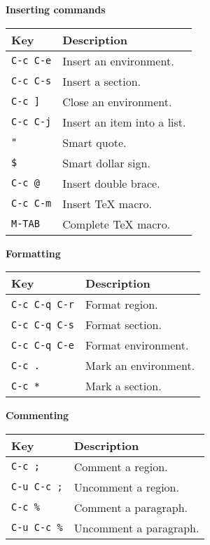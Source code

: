 \documentclass{article}
\begin{document}
\smallskip

\noindent
\textbf{Inserting commands}

\smallskip

\noindent
\begin{tabular}{p{\firstcol}p{\secondcol}}
\hline
\textbf{Key} & \textbf{Description}\\
\hline
\texttt{C-c C-e}
& Insert an environment.\\
\texttt{C-c C-s}
& Insert a section.\\
\texttt{C-c ]}
& Close an environment.\\
\texttt{C-c C-j}
& Insert an item into a list.\\
\texttt{"}
& Smart quote.\\
\texttt{\$}
& Smart dollar sign.\\
\texttt{C-c @}
& Insert double brace.\\
\texttt{C-c C-m}
& Insert \TeX{} macro.\\
\texttt{M-TAB}
& Complete \TeX{} macro.\\
\end{tabular}

\smallskip

\noindent
\textbf{Formatting}

\smallskip

\noindent
\begin{tabular}{p{\firstcol}p{\secondcol}}
\hline
\textbf{Key} & \textbf{Description}\\
\hline
\texttt{C-c C-q C-r}
& Format region.\\
\texttt{C-c C-q C-s}
& Format section.\\
\texttt{C-c C-q C-e}
& Format environment.\\
\texttt{C-c .}
& Mark an environment.\\
\texttt{C-c *}
& Mark a section.
\end{tabular}

\smallskip

\noindent
\textbf{Commenting}

\smallskip

\noindent
\begin{tabular}{p{\firstcol}p{\secondcol}}
\hline
\textbf{Key} & \textbf{Description}\\
\hline
\texttt{C-c ;}
& Comment a region.\\
\texttt{C-u C-c ;}
& Uncomment a region.\\
\texttt{C-c \%}
& Comment a paragraph.\\
\texttt{C-u C-c \%}
& Uncomment a paragraph.
\end{tabular}
\end{document}
